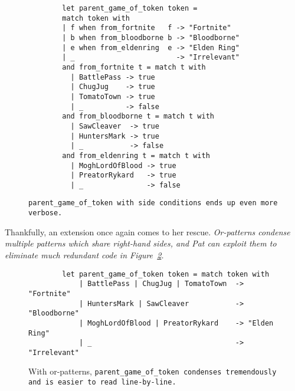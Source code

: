 \documentclass[manuscript,screen,review, 12pt]{acmart}
\begin{document}
\begin{outline}[enumerate]
        \begin{figure}
            \begin{center}
                \begin{verbatim}
        let parent_game_of_token token = 
        match token with 
        | f when from_fortnite   f -> "Fortnite"
        | b when from_bloodborne b -> "Bloodborne"
        | e when from_eldenring  e -> "Elden Ring"
        | _                        -> "Irrelevant"
        and from_fortnite t = match t with 
          | BattlePass -> true
          | ChugJug    -> true
          | TomatoTown -> true
          | _          -> false 
        and from_bloodborne t = match t with 
          | SawCleaver  -> true
          | HuntersMark -> true
          | _           -> false 
        and from_eldenring t = match t with 
          | MoghLordOfBlood -> true
          | PreatorRykard   -> true
          | _               -> false 
                \end{verbatim}
            \end{center}    

        \caption{\tt{parent\_game\_of\_token} with side conditions ends up 
        even more verbose.} 
        \label{fig:sideconditionpgot}
        \end{figure}

        Thankfully, an extension once again comes to her rescue.
        \it{Or-patterns} condense multiple patterns which share right-hand
        sides, and Pat can exploit them to eliminate much redundant code in
        Figure~\ref{fig:orpgot}.

    \begin{figure}
    \begin{center}
    \begin{verbatim}
        let parent_game_of_token token = match token with 
            | BattlePass | ChugJug | TomatoTown  -> "Fortnite"
            | HuntersMark | SawCleaver           -> "Bloodborne"
            | MoghLordOfBlood | PreatorRykard    -> "Elden Ring"
            | _                                  -> "Irrelevant"
    \end{verbatim}
    \end{center}    
    \caption{With or-patterns, \tt{parent\_game\_of\_token} condenses
    tremendously and is easier to read line-by-line.} 
    \label{fig:orpgot}
    \end{figure}


\end{outline}
\end{document}
